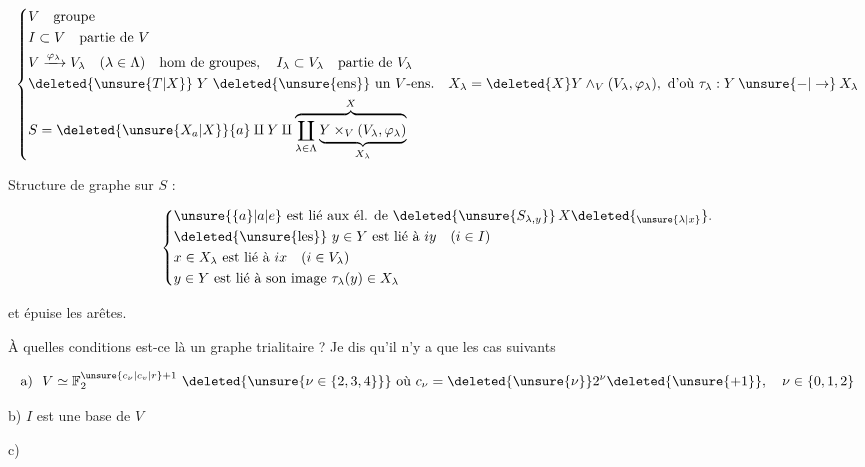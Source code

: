 
\[
\left\{\begin{aligned}
 &V\quad\text{groupe}\\
 &I\subset V\quad\text{partie de }V\\
 &V\xrightarrow{\varphi_\lambda}V_\lambda\quad(\lambda\in\Lambda)
 \quad\text{hom de groupes},\quad I_\lambda\subset V_\lambda\quad\text{partie de }V_\lambda\\
 &\deleted{\unsure{T|X}}\;Y\ \deleted{\unsure{\text{ens}}}\ \text{un }V\text{-ens.}
 \quad X_\lambda=\deleted{X}Y\mathbin{\wedge}_V(V_\lambda,\varphi_\lambda),\
 \text{d'où }\tau_\lambda:Y\mathbin{\unsure{-|\to}}X_\lambda\\
 &S=\deleted{\unsure{X_a|X}}\{a\}\amalg Y\amalg
 \overbrace{\coprod_{\lambda\in\Lambda}
 \underbrace{Y\times_V(V_\lambda,\varphi_\lambda)}_{X_\lambda}}^{X}
\end{aligned}\right.
\]

Structure de graphe sur $S$ :

\[
\left\{\begin{aligned}
 &\unsure{\{a\}|a|e}\ \text{est lié aux él. de } \deleted{\unsure{S_{\lambda,y}}}\,X\deleted{{}_{\unsure{\lambda|x}}}.\\
 &\deleted{\unsure{\text{les}}}\ y\in Y\ \text{est lié à }iy\quad(i\in I)\\
 &x\in X_\lambda\ \text{est lié à }ix\quad(i\in V_\lambda)\\
 &y\in Y\ \text{est lié à son image }\tau_\lambda(y)\in X_\lambda
\end{aligned}\right.
\]

et  épuise les arêtes.

À quelles conditions est-ce là un graphe trialitaire ? Je dis qu'il n'y a que les cas suivants

\[
 \text{a) }\ V\simeq\mathbb F_2^{\unsure{c_\nu|c_v|r}+1}\
 \deleted{\unsure{\nu\in\{2,3,4\}}}\ \text{où }c_\nu=
 \deleted{\unsure{\nu}}2^\nu\deleted{\unsure{+1}},\quad \nu\in\{0,1,2\}
\]

b) $I$ est une base de $V$

c)
